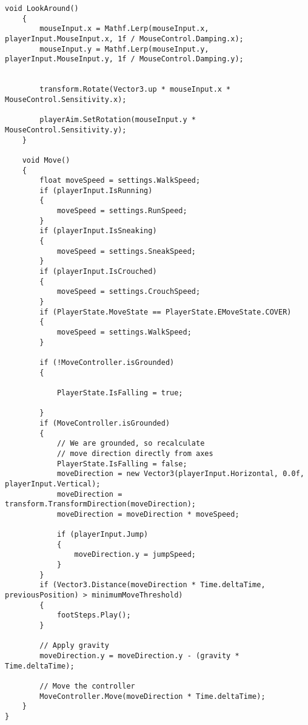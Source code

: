 \begin{lstlisting}[caption={LookAround i Move metode}, label=MovePlayer]
    void LookAround()
    {
        mouseInput.x = Mathf.Lerp(mouseInput.x, playerInput.MouseInput.x, 1f / MouseControl.Damping.x);
        mouseInput.y = Mathf.Lerp(mouseInput.y, playerInput.MouseInput.y, 1f / MouseControl.Damping.y);


        transform.Rotate(Vector3.up * mouseInput.x * MouseControl.Sensitivity.x);

        playerAim.SetRotation(mouseInput.y * MouseControl.Sensitivity.y);
    }

    void Move()
    {
        float moveSpeed = settings.WalkSpeed;
        if (playerInput.IsRunning)
        {
            moveSpeed = settings.RunSpeed;
        }
        if (playerInput.IsSneaking)
        {
            moveSpeed = settings.SneakSpeed;
        }
        if (playerInput.IsCrouched)
        {
            moveSpeed = settings.CrouchSpeed;
        }
        if (PlayerState.MoveState == PlayerState.EMoveState.COVER)
        {
            moveSpeed = settings.WalkSpeed;
        }
       
        if (!MoveController.isGrounded)
        {

            PlayerState.IsFalling = true;

        }
        if (MoveController.isGrounded)
        {
            // We are grounded, so recalculate
            // move direction directly from axes
            PlayerState.IsFalling = false;
            moveDirection = new Vector3(playerInput.Horizontal, 0.0f, playerInput.Vertical);
            moveDirection = transform.TransformDirection(moveDirection);
            moveDirection = moveDirection * moveSpeed;

            if (playerInput.Jump)
            {
                moveDirection.y = jumpSpeed;
            }
        }
        if (Vector3.Distance(moveDirection * Time.deltaTime, previousPosition) > minimumMoveThreshold)
        {
            footSteps.Play();
        }

        // Apply gravity
        moveDirection.y = moveDirection.y - (gravity * Time.deltaTime);

        // Move the controller
        MoveController.Move(moveDirection * Time.deltaTime);
    }
}
\end{lstlisting}

